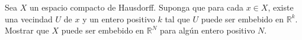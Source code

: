 
\item Sea \( X \) un espacio compacto de Hausdorff. Suponga que para cada \( x \in X \), existe una vecindad \( U \) de \( x \) y un entero positivo \( k \) tal que \( U \) puede ser embebido en \( \mathbb{R}^k \). Mostrar que \( X \) puede ser embebido en \( \mathbb{R}^N \) para algún entero positivo \( N \).
